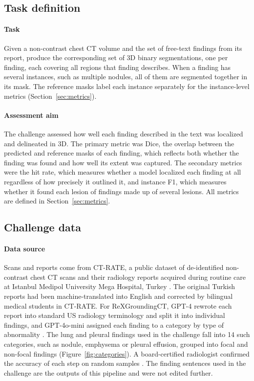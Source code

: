 \documentclass[final,5p,times,twocolumn,authoryear,numafflabel]{elsarticle}
\begin{document}
\subsection{Task definition}
\label{sec:mission}

\paragraph{Task}
Given a non-contrast chest CT volume and the set of free-text findings from
its report, produce the corresponding set of 3D binary segmentations, one per
finding, each covering all regions that finding describes. When a finding has
several instances, such as multiple nodules, all of them are segmented
together in its mask. The reference masks label each instance separately for
the instance-level metrics (Section~\ref{sec:metrics}).

\paragraph{Assessment aim}
The challenge assessed how well each finding described in the text was
localized and delineated in 3D. The primary metric was Dice, the overlap between
the predicted and reference masks of each finding, which reflects both whether
the finding was found and how well its extent was captured. The secondary
metrics were the hit rate, which measures whether a model localized each finding
at all regardless of how precisely it outlined it, and instance F1, which
measures whether it found each lesion of findings made up of several lesions.
All metrics are defined in Section~\ref{sec:metrics}.

\subsection{Challenge data}
\label{sec:data}

\paragraph{Data source}
Scans and reports come from CT-RATE, a public dataset of
de-identified non-contrast chest CT scans and their radiology reports acquired
during routine care at Istanbul Medipol University Mega Hospital, Turkey
\citep{hamamci2026generalist}. The original Turkish reports had been
machine-translated into English and corrected by bilingual medical students in
CT-RATE. For ReXGroundingCT, GPT-4 rewrote each report into standard US
radiology terminology and split it into individual findings, and GPT-4o-mini
assigned each finding to a category by type of abnormality
\citep{baharoon2026rexgroundingct}. The lung and pleural findings used in the
challenge fall into 14 such categories, such as nodule, emphysema or pleural
effusion, grouped into focal and non-focal findings
(Figure~\ref{fig:categories}). A board-certified radiologist confirmed the
accuracy of each step on random samples \citep{baharoon2026rexgroundingct}. The finding sentences used in the challenge
are the outputs of this pipeline and were not edited further.
\end{document}
